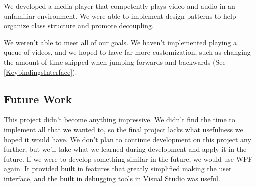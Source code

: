 \documentclass[10pt,conference,onecolumn,compsoc]{IEEEtran}
\begin{document}
We developed a media player that competently plays video and audio in an unfamiliar environment. We were able to implement design patterns to help organize class structure and promote decoupling. \par

We weren't able to meet all of our goals. We haven't implemented playing a queue of videos, and we hoped to have far more customization, such as changing the amount of time skipped when jumping forwards and backwards (See \ref{KeybindingsInterface}).

\subsection{Future Work}
This project didn't become anything impressive. We didn't find the time to implement all that we wanted to, so the final project lacks what usefulness we hoped it would have. We don't plan to continue development on this project any further, but we'll take what we learned during development and apply it in the future. If we were to develop something similar in the future, we would use WPF again. It provided built in features that greatly simplified making the user interface, and the built in debugging tools in Visual Studio was useful.
















\end{document}
